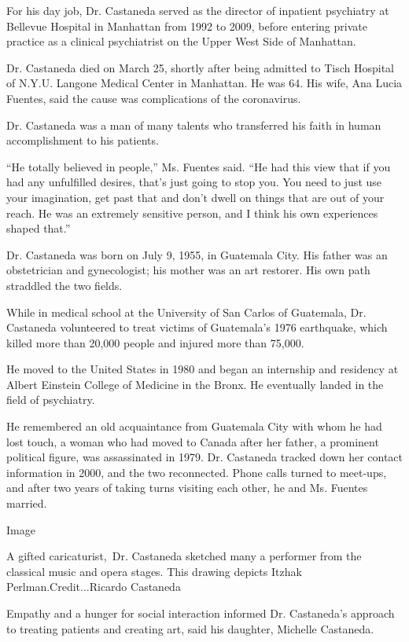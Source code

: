 For his day job, Dr. Castaneda served as the director of inpatient
psychiatry at Bellevue Hospital in Manhattan from 1992 to 2009, before
entering private practice as a clinical psychiatrist on the Upper West
Side of Manhattan.

Dr. Castaneda died on March 25, shortly after being admitted to Tisch
Hospital of N.Y.U. Langone Medical Center in Manhattan. He was 64. His
wife, Ana Lucia Fuentes, said the cause was complications of the
coronavirus.

Dr. Castaneda was a man of many talents who transferred his faith in
human accomplishment to his patients.

``He totally believed in people,'' Ms. Fuentes said. ``He had this view
that if you had any unfulfilled desires, that's just going to stop you.
You need to just use your imagination, get past that and don't dwell on
things that are out of your reach. He was an extremely sensitive person,
and I think his own experiences shaped that.''

Dr. Castaneda was born on July 9, 1955, in Guatemala City. His father
was an obstetrician and gynecologist; his mother was an art restorer.
His own path straddled the two fields.

While in medical school at the University of San Carlos of Guatemala,
Dr. Castaneda volunteered to treat victims of Guatemala's 1976
earthquake, which killed more than 20,000 people and injured more than
75,000.

He moved to the United States in 1980 and began an internship and
residency at Albert Einstein College of Medicine in the Bronx. He
eventually landed in the field of psychiatry.

He remembered an old acquaintance from Guatemala City with whom he had
lost touch, a woman who had moved to Canada after her father, a
prominent political figure, was assassinated in 1979. Dr. Castaneda
tracked down her contact information in 2000, and the two reconnected.
Phone calls turned to meet-ups, and after two years of taking turns
visiting each other, he and Ms. Fuentes married.

Image

A gifted caricaturist,~Dr. Castaneda sketched many a performer from the
classical music and opera stages. This drawing depicts Itzhak
Perlman.Credit...Ricardo Castaneda

Empathy and a hunger for social interaction informed Dr. Castaneda's
approach to treating patients and creating art, said his daughter,
Michelle Castaneda.

